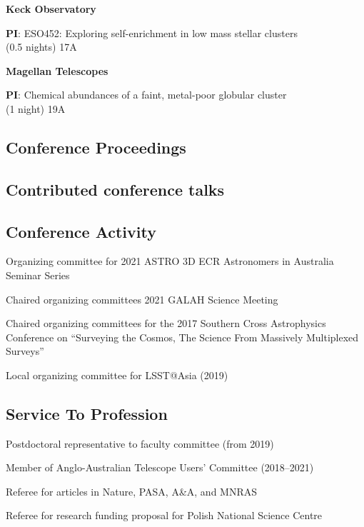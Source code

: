 \documentclass[10pt]{article}
\newcommand{\cvlist}{}
\begin{document}
\vspace{0.1in}
\textbf{Keck Observatory}
\begin{innerlist}
\item \textbf{PI}: ESO452: Exploring self-enrichment in low mass stellar clusters\\ (0.5 nights)  \hfill{17A}
\end{innerlist}
\vspace{0.1in}
\textbf{Magellan Telescopes}
\begin{innerlist}
\item \textbf{PI}: Chemical abundances of a faint, metal-poor globular cluster\\ (1 night)  \hfill{19A}
\end{innerlist}

\subsection*{Conference Proceedings}
\begin{list}{}{\cvlist}

\end{list}

\subsection*{Contributed conference talks}
\begin{list}{}{\cvlist}

\end{list}

\subsection*{Conference Activity}
\begin{innerlist}
	\item Organizing committee for 2021 ASTRO 3D ECR Astronomers in Australia Seminar Series
	\item Chaired organizing committees 2021 GALAH Science Meeting
	\item Chaired organizing committees for the 2017 Southern Cross Astrophysics Conference on ``Surveying the Cosmos, The Science From Massively Multiplexed Surveys''
	\item Local organizing committee for LSST@Asia (2019)
\end{innerlist}


\subsection*{Service To Profession}
\begin{innerlist}
\item Postdoctoral representative to faculty committee (from 2019)
\item Member of Anglo-Australian Telescope Users' Committee (2018--2021)
\item Referee for articles in Nature, PASA, A\&A, and MNRAS
\item Referee for research funding proposal for Polish National Science Centre
\end{innerlist}
\end{document}

